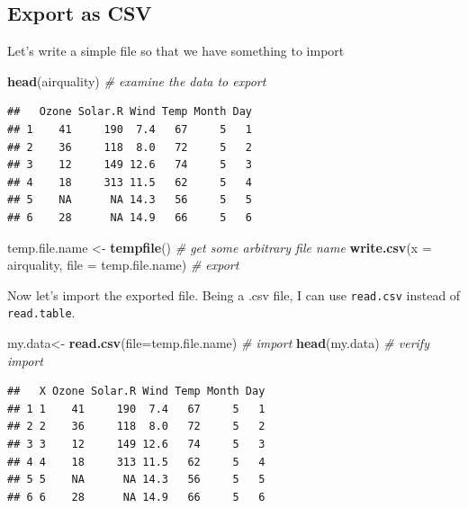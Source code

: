 \documentclass[]{book}
\newenvironment{Shaded}{\begin{snugshade}}{\end{snugshade}}
\newcommand{\KeywordTok}[1]{\textcolor[rgb]{0.13,0.29,0.53}{\textbf{{#1}}}}
\newcommand{\DataTypeTok}[1]{\textcolor[rgb]{0.13,0.29,0.53}{{#1}}}
\newcommand{\StringTok}[1]{\textcolor[rgb]{0.31,0.60,0.02}{{#1}}}
\newcommand{\CommentTok}[1]{\textcolor[rgb]{0.56,0.35,0.01}{\textit{{#1}}}}
\newcommand{\NormalTok}[1]{{#1}}
\theoremstyle{definition}
\theoremstyle{definition}
\theoremstyle{remark}
\begin{document}
\subsection{Export as CSV}\label{export-as-csv}

Let's write a simple file so that we have something to import

\begin{Shaded}
\begin{Highlighting}[]
\KeywordTok{head}\NormalTok{(airquality) }\CommentTok{#  examine the data to export}
\end{Highlighting}
\end{Shaded}

\begin{verbatim}
##   Ozone Solar.R Wind Temp Month Day
## 1    41     190  7.4   67     5   1
## 2    36     118  8.0   72     5   2
## 3    12     149 12.6   74     5   3
## 4    18     313 11.5   62     5   4
## 5    NA      NA 14.3   56     5   5
## 6    28      NA 14.9   66     5   6
\end{verbatim}

\begin{Shaded}
\begin{Highlighting}[]
\NormalTok{temp.file.name <-}\StringTok{ }\KeywordTok{tempfile}\NormalTok{() }\CommentTok{# get some arbitrary file name}
\KeywordTok{write.csv}\NormalTok{(}\DataTypeTok{x =} \NormalTok{airquality, }\DataTypeTok{file =} \NormalTok{temp.file.name) }\CommentTok{# export}
\end{Highlighting}
\end{Shaded}

Now let's import the exported file. Being a .csv file, I can use
\texttt{read.csv} instead of \texttt{read.table}.

\begin{Shaded}
\begin{Highlighting}[]
\NormalTok{my.data<-}\StringTok{ }\KeywordTok{read.csv}\NormalTok{(}\DataTypeTok{file=}\NormalTok{temp.file.name) }\CommentTok{# import}
\KeywordTok{head}\NormalTok{(my.data) }\CommentTok{# verify import}
\end{Highlighting}
\end{Shaded}

\begin{verbatim}
##   X Ozone Solar.R Wind Temp Month Day
## 1 1    41     190  7.4   67     5   1
## 2 2    36     118  8.0   72     5   2
## 3 3    12     149 12.6   74     5   3
## 4 4    18     313 11.5   62     5   4
## 5 5    NA      NA 14.3   56     5   5
## 6 6    28      NA 14.9   66     5   6
\end{verbatim}
\end{document}
